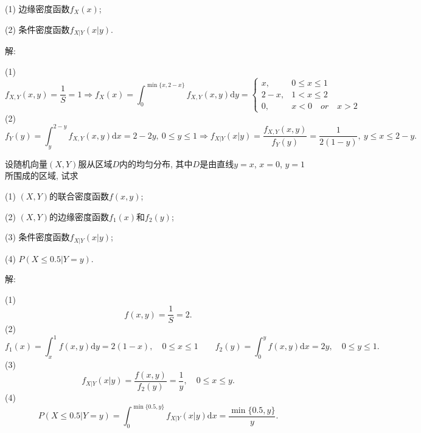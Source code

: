 \documentclass[standard]{ExBook}
\renewenvironment{shaded}{%
  \def\FrameCommand{\fboxsep=\FrameSep \colorbox{shadecolor}}%
  \MakeFramed{\advance\hsize-\width \FrameRestore}%
}{%
  \endMakeFramed
}
\begin{document}
\begin{qitems}
\begin{bbox}
\begin{shaded}
(1) 边缘密度函数$f_{X}(x)$;

(2) 条件密度函数$f_{X|Y}(x|y)$.
    \end{shaded}
    \end{bbox}

\vspace{\dimexpr2.5cm-5em\relax}

解: 

(1)
$$
    f_{X,Y}(x,y)=\frac{1}{S}=1
    \Longrightarrow
    f_{X}(x)=\int_{0}^{\min\{x,2-x\}}f_{X,Y}(x,y)\mathrm{d}y=
    \left\{
    \begin{array}{ll}
        x, & 0\leq x\leq 1\\
        2-x, & 1<x\leq2\\
        0, & x<0\quad or\quad x>2
    \end{array}
    \right.
$$
(2)
$$f_{Y}(y)=\int_{y}^{2-y}f_{X,Y}(x,y)\mathrm{d}x=2-2y,\ 0\leq y\leq 1 \Longrightarrow f_{X|Y}(x|y)=\frac{f_{X,Y}(x,y)}{f_{Y}(y)}=\frac{1}{2(1-y)},\ y\leq x\leq 2-y.$$

\vspace{2.5cm-5em}

    \begin{bbox}
    \begin{shaded}
        \qitem
设随机向量$(X,Y)$服从区域$D$内的均匀分布, 其中$D$是由直线$y=x$, $x=0$, $y=1$所围成的区域, 试求

(1) $(X,Y)$的联合密度函数$f(x,y)$;

(2) $(X,Y)$的边缘密度函数$f_{1}(x)$和$f_{2}(y)$;

(3) 条件密度函数$f_{X|Y}(x|y)$;

(4) $P(X\leq 0.5|Y=y)$.
    \end{shaded}
    \end{bbox}

\vspace{\dimexpr2.5cm-5em\relax}

解: 

(1)
$$f(x,y)=\frac{1}{S}=2.$$
(2)
$$f_{1}(x)=\int_{x}^{1}f(x,y)\mathrm{d}y=2(1-x),\quad 0\leq x\leq 1\qquad f_{2}(y)=\int_{0}^{y}f(x,y)\mathrm{d}x=2y,\quad 0\leq y\leq 1.$$
(3)
$$f_{X|Y}(x|y)=\frac{f(x,y)}{f_{2}(y)}=\frac{1}{y},\quad 0\leq x\leq y.$$
(4)
$$P(X\leq0.5|Y=y)=\int_{0}^{\min\{0.5,y\}}f_{X|Y}(x|y)\mathrm{d}x=\frac{\min\{0.5,y\}}{y}.$$

\vspace{2.5cm-5em}


\end{qitems}
\end{document}
